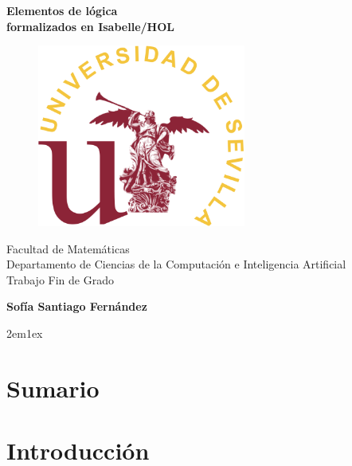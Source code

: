 \documentclass[12pt,a4paper,twoside]{book}
\begin{document}
\begin{titlepage}
 \vspace*{2cm}
  \begin{center}
    {\huge \textbf{Elementos de lógica \\ \vspace*{1em}
                   formalizados en Isabelle/HOL}}
  \end{center}
  \vspace{3cm}
  \begin{center}
    \begin{figure}[h]
    \centering
    \includegraphics[height=6cm]{sello.png}
    \end{figure}
  \vspace{3cm}
    {\normalsize Facultad de Matemáticas} \\
    {\normalsize Departamento de Ciencias de la Computación e Inteligencia Artificial}\\
    {\normalsize Trabajo Fin de Grado} \\
  \end{center}
  \begin{center}
    {\large \textbf{Sofía Santiago Fernández}}
  \end{center}
\end{titlepage}

\newpage

\tableofcontents

\parindent 2em\parskip 1ex

% 
\chapter*{Sumario}

\chapter*{Introducción}

\end{document}
